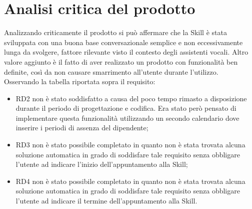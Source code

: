 \section{Analisi critica del prodotto}
Analizzando criticamente il prodotto si può affermare che la Skill è stata sviluppata con una buona base conversazionale semplice e non eccessivamente lunga da svolgere, fattore rilevante visto il contesto degli assistenti vocali. Altro valore aggiunto è il fatto di aver realizzato un prodotto con funzionalità ben definite, così da non causare smarrimento all'utente durante l'utilizzo.
\\[0.5cm]
Osservando la tabella riportata sopra il requisito:\\
\begin{itemize}
    \item RD2 non è stato soddisfatto a causa del poco tempo rimasto a disposizione durante il periodo di progettazione e codifica. Era stato però pensato di implementare questa funzionalità utilizzando un secondo calendario dove inserire i periodi di assenza del dipendente;
    \item RD3 non è stato possibile completato in quanto non è stata trovata alcuna soluzione automatica in grado di soddisfare tale requisito senza obbligare l'utente ad indicare l'inizio dell'appuntamento alla Skill;
	\item RD4 non è stato possibile completato in quanto non è stata trovata alcuna soluzione automatica in grado di soddisfare tale requisito senza obbligare l'utente ad indicare il termine dell'appuntamento alla Skill.
\end{itemize}

